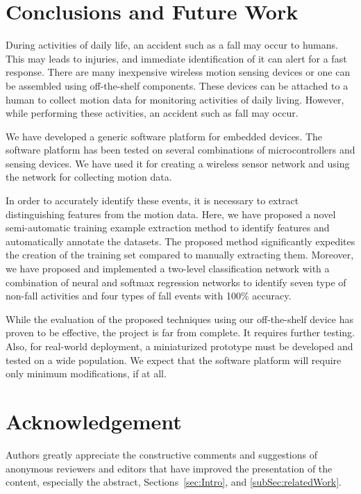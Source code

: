\documentclass[]{IEEEtran}
\begin{document}
\section{Conclusions and Future Work}
  
During activities of daily life, an accident such as a fall may occur to
humans. This may leads to injuries, and immediate identification of it can alert
for a fast response.  There are many inexpensive wireless motion sensing
devices or one can be assembled using off-the-shelf components. These devices
can be attached to a human to collect motion data for monitoring activities of
daily living. 
However, while performing these activities, an accident such as fall may occur.

We have developed a generic software platform for embedded devices. The
software platform has been tested on several combinations of microcontrollers
and sensing devices. We have used it for creating a wireless sensor network and
using the network for collecting motion data.

In order to accurately identify these events, it is necessary to extract
distinguishing features from the motion data. Here, we have proposed a novel
semi-automatic training example extraction method to identify features and
automatically annotate the datasets. The proposed method significantly
expedites the creation of the training set compared to manually extracting
them. Moreover, we have proposed and implemented a two-level classification
network with  a combination of neural and softmax regression networks to
identify seven type of non-fall activities and four types of fall events with
100\% accuracy. 

While the evaluation of the proposed techniques using our off-the-shelf device
has proven to be effective, the project is far from complete. It requires
further testing. Also, for real-world deployment, a miniaturized prototype must
be developed and tested on a wide population. We expect that the software
platform will require only minimum modifications, if at all.

\section*{Acknowledgement} \label{sec:Acknowledgement} Authors greatly
appreciate the constructive comments and suggestions of anonymous reviewers and
editors that have improved the presentation of the content, especially the
abstract, Sections~\ref{sec:Intro}, and \ref{subSec:relatedWork}.
\end{document}
